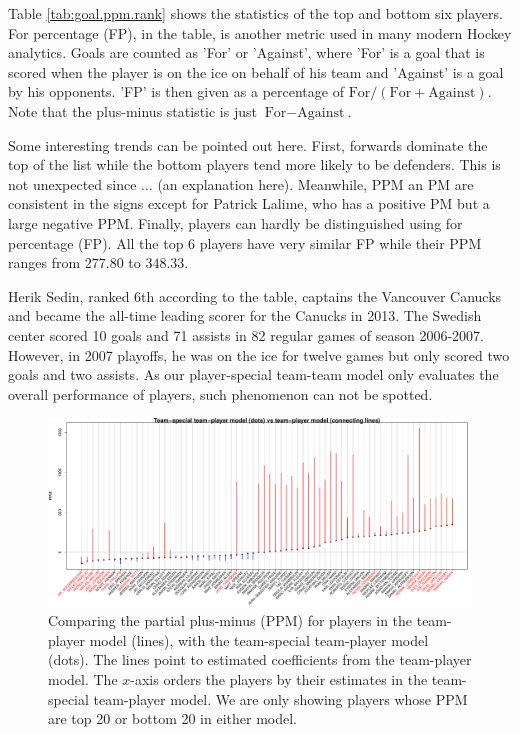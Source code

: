 Table \ref{tab:goal.ppm.rank} shows the statistics of the top and bottom six players. For percentage (FP), in the table, is another metric used in many modern Hockey analytics. Goals are counted as 'For' or 'Against', where 'For' is a goal that is scored when the player is on the ice on behalf of his team and 'Against' is a goal by his opponents. 'FP' is then given as a percentage of $\text{For}/(\text{For}+\text{Against})$. Note that the plus-minus statistic is just $\text{For}-\text{Against}$. 

Some interesting trends can be pointed out here. First, forwards dominate the top of the list while the bottom players tend more likely to be defenders. This is not unexpected since ... (an explanation here). Meanwhile, PPM an PM are consistent in the signs except for Patrick Lalime, who has a positive PM but a large negative PPM. Finally, players can hardly be distinguished using for percentage (FP). All the top 6 players have very similar FP while their PPM ranges from $277.80$ to $348.33$. 

Herik Sedin, ranked 6th according to the table, captains the Vancouver Canucks and became the all-time leading scorer for the Canucks in 2013. The Swedish center scored 10 goals and 71 assists in 82 regular games of season 2006-2007. However, in 2007 playoffs, he was on the ice for twelve games but only scored two goals and two assists. As our player-special team-team model only evaluates the overall performance of players, such phenomenon can not be spotted. 

\begin{figure}[htb!]
    \centering
    \includegraphics[width=\textwidth]{figures/ptsvspt_tb20.pdf}
    \caption{Comparing the partial plus-minus (PPM) for players in the team-player model (lines), with the team-special team-player model (dots). The lines point to estimated coefficients from the team-player model. The $x$-axis orders the players by their estimates in the team-special team-player model. We are only showing players whose PPM are top 20 or bottom 20 in either model.}\label{fig:pts-pt.tb20}
\end{figure}

